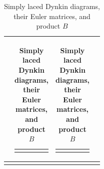 \documentclass{amsart}
\newcommand{\centered}[1]{\begin{tabular}{l} #1 \end{tabular}}
\theoremstyle{theorem}
\theoremstyle{theorem*}
\theoremstyle{definition}
\begin{document}
\begin{longtable}[H]{|c|c|c|c|}
{\begin{tikzpicture}[
        > = stealth, %
        auto, node distance = 7mm, %
        semithick %
    ]
\end{tikzpicture}} &
    \centered{$E = \begin{pmatrix}
        1 & -1 & 0 & 0 & 0 & 0 & 0 & 0 & \\ 0 & 1 & -1 & 0 & 0 & 0 & 0 & 0 & \\
        0 & 0 & 1 & -1 & -1 & 0 & 0 & 0 & \\ 0 & 0 & 0 & 1 & 0 & 0 & 0 & 0 & \\
        0 & 0 & 0 & 0 & 1 & -1 & 0 & 0 & \\ 0 & 0 & 0 & 0 & 0 & 1 & -1 & 0 & \\
        0 & 0 & 0 & 0 & 0 & 0 & 1 & -1 & \\ 0 & 0 & 0 & 0 & 0 & 0 & 0 & 1 & \\
    \end{pmatrix}$} &
    \centered{$B = \begin{pmatrix}
        -1 & -1 & -1 & -1 & -1 & -1 & -1 & -1 & \\
        1 & 0 & 0 & 0 & 0 & 0 & 0 & 0 & \\ 0 & 1 & 0 & 0 & 0 & 0 & 0 & 0 & \\
        0 & 0 & 1 & 0 & 1 & 1 & 1 & 1 & \\ 0 & 0 & 1 & 1 & 0 & 0 & 0 & 0 & \\
        0 & 0 & 0 & 0 & 1 & 0 & 0 & 0 & \\ 0 & 0 & 0 & 0 & 0 & 1 & 0 & 0 & \\
        0 & 0 & 0 & 0 & 0 & 0 & 1 & 0 & \\
    \end{pmatrix}$}  \\
    \hline
    
    \caption{Simply laced Dynkin diagrams, their Euler matrices, and product $B$}
    \label{tab:ade1}
\end{longtable}
\normalsize
\end{document}
